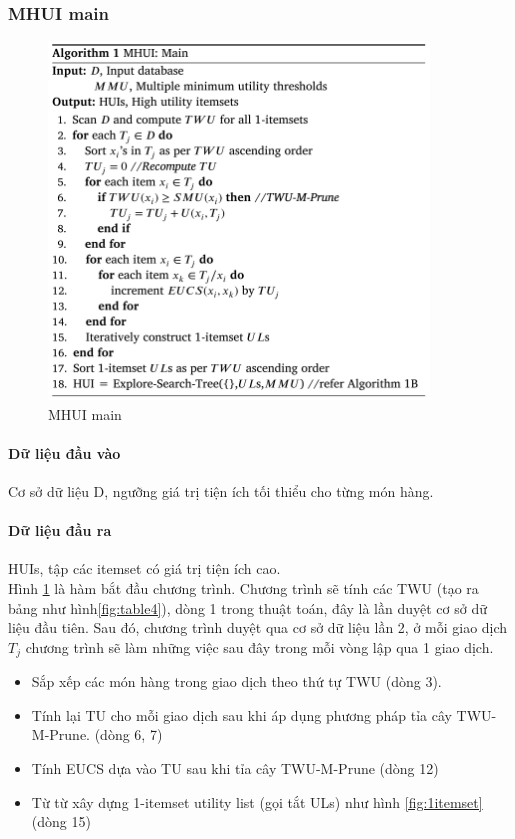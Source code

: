 
\subsubsection{MHUI main}

\begin{figure}[ht]
\centering
\includegraphics[width=0.9\textwidth]{image/algo/algo1.PNG}
\caption{\label{fig:algo1} MHUI main}
\end{figure}

\paragraph{Dữ liệu đầu vào} Cơ sở dữ liệu D, ngưỡng giá trị tiện ích tối thiểu cho từng món hàng.  
\paragraph{Dữ liệu đầu ra} HUIs, tập các itemset có giá trị tiện ích cao.\\



Hình \ref{fig:algo1} là hàm bắt đầu chương trình. Chương trình sẽ tính các TWU (tạo ra bảng như hình\ref{fig:table4}), dòng 1 trong thuật toán, đây là lần duyệt cơ sở dữ liệu đầu tiên. Sau đó, chương trình duyệt qua cơ sở dữ liệu lần 2, ở mỗi giao dịch $T_j$ chương trình sẽ làm những việc sau đây trong mỗi vòng lập qua 1 giao dịch.

\begin{itemize}
  \item Sắp xếp các món hàng trong giao dịch theo thứ tự TWU (dòng 3). 
  \item Tính lại TU cho mỗi giao dịch sau khi áp dụng phương pháp tỉa cây TWU-M-Prune. (dòng 6, 7)
  \item Tính EUCS dựa vào TU sau khi tỉa cây TWU-M-Prune (dòng 12)
  \item Từ từ xây dựng 1-itemset utility list (gọi tắt ULs) như hình \ref{fig:1itemset} (dòng 15) 
\end{itemize}

